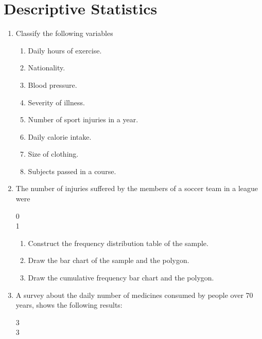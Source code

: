 
\section{Descriptive Statistics}
\begin{enumerate}[leftmargin=*]
\item Classify the following variables
\begin{enumerate}
\item Daily hours of exercise.
\item Nationality.
\item Blood pressure.
\item Severity of illness. 
\item Number of sport injuries in a year.
\item Daily calorie intake.
\item Size of clothing.
\item Subjects passed in a course. 
\end{enumerate}

\item \label{soccer-injuries}The number of injuries suffered by the members of a soccer team in a league were
\begin{center}
0            \\
1           
\end{center}

\begin{enumerate}
\item Construct the frequency distribution table of the sample.
\item Draw the bar chart of the sample and the polygon.
\item Draw the cumulative frequency bar chart and the polygon. 
\end{enumerate}

\item A survey about the daily number of medicines consumed by people over 70 years, shows the following results:

\begin{center}
3 \\
3
\end{center} 


\end{enumerate}
